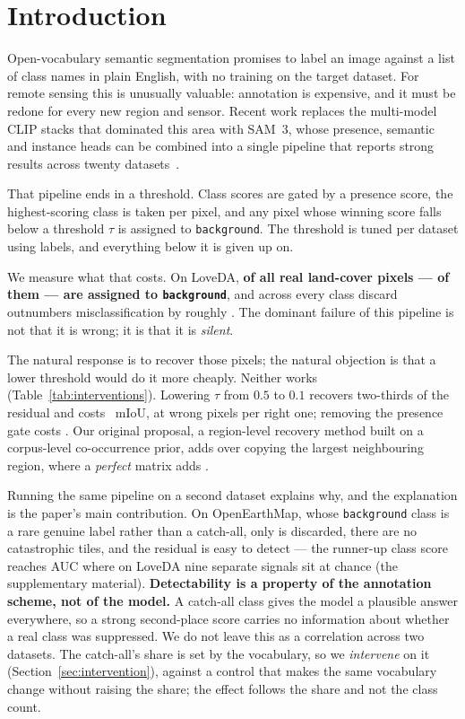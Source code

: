 \documentclass[10pt,a4paper]{article}                        %
\newcommand{\best}[1]{\textbf{#1}}
\newcommand{\bg}{\texttt{background}}
\newcommand{\suppref}[1]{the supplementary material}
\begin{document}
\section{Introduction}
\label{sec:intro}

Open-vocabulary semantic segmentation promises to label an image against a list
of class names in plain English, with no training on the target dataset. For
remote sensing this is unusually valuable: annotation is expensive, and it must
be redone for every new region and sensor. Recent work replaces the multi-model
CLIP stacks that dominated this area with SAM~3, whose presence, semantic and
instance heads can be combined into a single pipeline that reports strong
results across twenty datasets~\cite{segearthov3}.

That pipeline ends in a threshold. Class scores are gated by a presence score,
the highest-scoring class is taken per pixel, and any pixel whose winning score
falls below a threshold $\tau$ is assigned to \bg{}. The threshold is tuned per
dataset using labels, and everything below it is given up on.

We measure what that costs. On LoveDA, \best{\discardPct{} of all real
land-cover pixels --- \discardPx{} of them --- are assigned to \bg{}}, and
across every class discard outnumbers misclassification by roughly
\discardRatio{}. The dominant failure of this pipeline is not that it is wrong;
it is that it is \emph{silent}.

The natural response is to recover those pixels; the natural objection is that a
lower threshold would do it more cheaply. Neither works
(Table~\ref{tab:interventions}). Lowering $\tau$ from $0.5$ to $0.1$ recovers
two-thirds of the residual and costs \tauCost{}~mIoU, at \tauRatio{} wrong pixels
per right one; removing the presence gate costs \presCost{}. Our original
proposal, a region-level recovery method built on a corpus-level co-occurrence
prior, adds \priorGain{} over copying the largest neighbouring region, where a
\emph{perfect} matrix adds \priorOracle{}.

Running the same pipeline on a second dataset explains why, and the explanation
is the paper's main contribution. On OpenEarthMap, whose \bg{} class is a rare
genuine label rather than a catch-all, only \discardOEM{} is discarded, there
are no catastrophic tiles, and the residual is easy to detect --- the runner-up
class score reaches AUC \aucOEM{} where on LoveDA nine separate signals sit at
chance (\suppref{sup:auc}). \best{Detectability is a property of the annotation scheme, not of the
model.} A catch-all class gives the model a plausible answer everywhere, so a
strong second-place score carries no information about whether a real class was
suppressed. We do not leave this as a correlation across two datasets. The
catch-all's share is set by the vocabulary, so we \emph{intervene} on it
(Section~\ref{sec:intervention}), against a control that makes the same
vocabulary change without raising the share; the effect follows the share and not
the class count.
\end{document}
